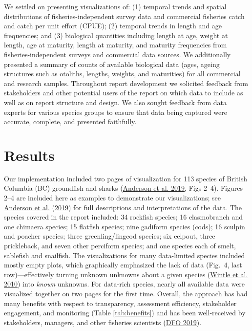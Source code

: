 \documentclass[12pt,]{article}
\begin{document}
We settled on presenting visualizations of: (1) temporal trends and spatial distributions of fisheries-independent survey data and commercial fisheries catch and catch per unit effort (CPUE); (2) temporal trends in length and age frequencies; and (3) biological quantities including length at age, weight at length, age at maturity, length at maturity, and maturity frequencies from fisheries-independent surveys and commercial data sources. We additionally presented a summary of counts of available biological data (ages, ageing structures such as otoliths, lengths, weights, and maturities) for all commercial and research samples. Throughout report development we solicited feedback from stakeholders and other potential users of the report on which data to include as well as on report structure and design. We also sought feedback from data experts for various species groups to ensure that data being captured were accurate, complete, and presented faithfully.

\hypertarget{results}{%
\section*{Results}\label{results}}

Our implementation included two pages of visualization for 113 species of
British Columbia (BC) groundfish and sharks (\protect\hyperlink{ref-anderson2019synopsis}{Anderson et al. 2019}, Figs
2--4). Figures 2--4 are included here as examples to demonstrate our
visualizations; see \protect\hyperlink{ref-anderson2019synopsis}{Anderson et al.} (\protect\hyperlink{ref-anderson2019synopsis}{2019}) for full descriptions and
interpretations of the data.
The species covered in the report included: 34 rockfish species; 16
elasmobranch and one chimaera species; 15 flatfish species; nine
gadiform species (cods); 16 sculpin and poacher species; three greenling/lingcod
species; six eelpout, three prickleback, and seven other
perciform species; and one species each of smelt, sablefish and snailfish. The
visualizations for many data-limited species included mostly empty plots, which
graphically emphasized the lack of data (Fig.~4, last row)---effectively
turning unknown unknowns about a given species (\protect\hyperlink{ref-wintle2010}{Wintle et al. 2010}) into \emph{known}
unknowns. For data-rich species, nearly all available data were visualized
together on two pages for the first time. Overall, the approach has had many
benefits with respect to transparency, assessment efficiency, stakeholder
engagement, and monitoring (Table \ref{tab:benefits}) and has been
well-received by stakeholders, managers, and other fisheries scientists
(\protect\hyperlink{ref-dfo2019synopsis}{DFO 2019}).
\end{document}
